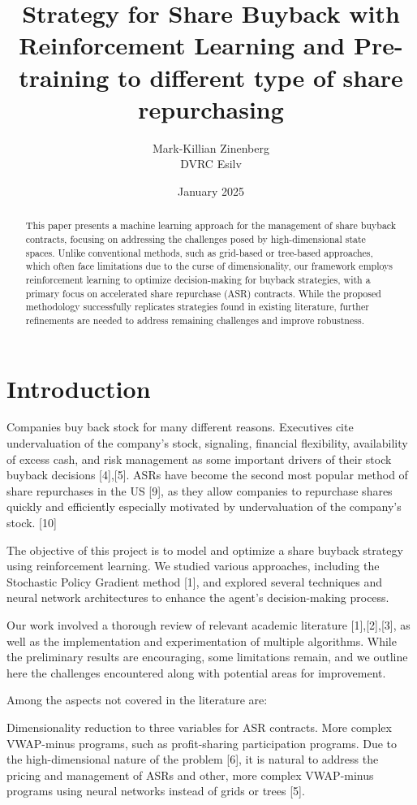 \documentclass[a4paper, 12pt]{article}
\title{Strategy for Share Buyback with Reinforcement Learning and Pre-training to different type of share repurchasing}
\author{Mark-Killian Zinenberg \\ DVRC Esilv}
\date{January 2025}
\begin{document}
\maketitle

\begin{abstract}
This paper presents a machine learning approach for the management of share buyback contracts, focusing on addressing the challenges posed by high-dimensional state spaces. Unlike conventional methods, such as grid-based or tree-based approaches, which often face limitations due to the curse of dimensionality, our framework employs reinforcement learning to optimize decision-making for buyback strategies, with a primary focus on accelerated share repurchase (ASR) contracts. While the proposed methodology successfully replicates strategies found in existing literature, further refinements are needed to address remaining challenges and improve robustness.
\end{abstract}

\section{Introduction}
Companies buy back stock for many different reasons. Executives cite undervaluation of the company’s stock, signaling, financial flexibility, availability of excess cash, and risk
management as some important drivers of their stock buyback decisions [4],[5]. ASRs have become the second most popular method of share repurchases in the US [9], as they allow companies to repurchase shares quickly and efficiently especially motivated by undervaluation of the company’s stock. [10] 

The objective of this project is to model and optimize a share buyback strategy using reinforcement learning. We studied various approaches, including the Stochastic Policy Gradient method [1], and explored several techniques and neural network architectures to enhance the agent's decision-making process.

Our work involved a thorough review of relevant academic literature [1],[2],[3], as well as the implementation and experimentation of multiple algorithms. While the preliminary results are encouraging, some limitations remain, and we outline here the challenges encountered along with potential areas for improvement.

Among the aspects not covered in the literature are:

Dimensionality reduction to three variables for ASR contracts.
More complex VWAP-minus programs, such as profit-sharing participation programs.
Due to the high-dimensional nature of the problem [6], it is natural to address the pricing and management of ASRs and other, more complex VWAP-minus programs using neural networks instead of grids or trees [5].
\end{document}
